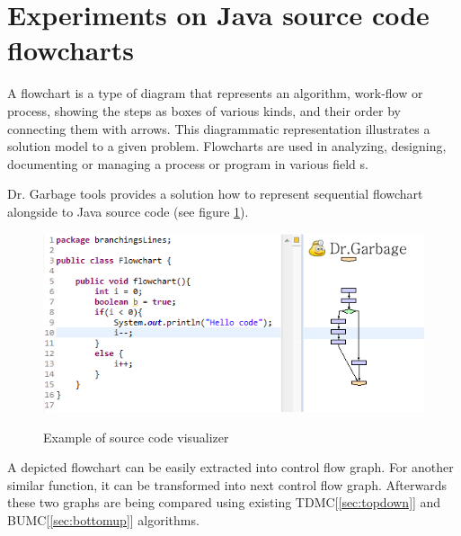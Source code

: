 \documentclass{report}
\begin{document}
\section{Experiments on Java source code flowcharts}

A flowchart is a type of diagram that represents an algorithm, work-flow or process, showing the steps as boxes of various kinds, and their order by connecting them with arrows. This diagrammatic representation illustrates a solution model to a given problem. Flowcharts are used in analyzing, designing, documenting or managing a process or program in various field s\cite{wiki_flowchart}.

Dr. Garbage tools \cite{drgarbage} provides a solution how to represent sequential flowchart alongside to Java source code (see figure \ref{fig:java-flowchart-example}).
\begin{figure}[h]
  \centering
  \includegraphics[scale = 0.65]{Figures/Java-flowchart-exp/java-flowchart-example.png}\\[0.1cm]
  \caption[Java sequential block diagram opened in Java Source code Visualizer]{Example of source code visualizer}
  \label{fig:java-flowchart-example}
\end{figure}

A depicted flowchart can be easily extracted into control flow graph. For another similar function, it can be transformed into next control flow graph. Afterwards these two graphs are being compared using existing TDMC[\ref{sec:topdown}] and BUMC[\ref{sec:bottomup}] algorithms. 
\end{document}
